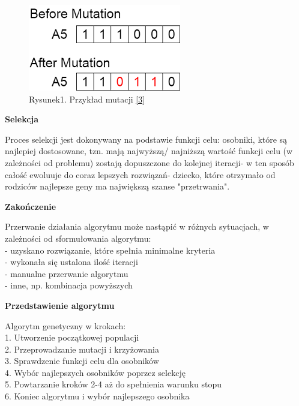 \documentclass[a4paper, twoside, 12pt, justified]{article}
\begin{document}
	\newpage

	\begin{figure}[h]
		\includegraphics[scale=1]{mutation}
		\centering
		\\
		{Rysunek1. Przykład mutacji \hyperlink{mutation}{[3]} } 
	\end{figure}
	
	\begin{center}
		\textbf{Selekcja}
	\end{center}    
	
	Proces selekcji jest dokonywany na podstawie funkcji celu: osobniki, które są najlepiej dostosowane, tzn. mają najwyższą/ najniższą wartość funkcji celu (w zależności od problemu) zostają dopuszczone do kolejnej iteracji- w ten sposób całość ewoluuje do coraz lepszych rozwiązań- dziecko, które otrzymało od rodziców najlepsze geny ma największą szanse "przetrwania".
	
	
	\begin{center}
		\textbf{Zakończenie}
	\end{center} 	

	Przerwanie działania algorytmu może nastąpić w różnych sytuacjach, w zależności od sformułowania algorytmu:\\
	- uzyskano rozwiązanie, które spełnia minimalne kryteria\\
	- wykonała się ustalona ilość iteracji\\
	- manualne przerwanie algorytmu\\
	- inne, np. kombinacja powyższych\\

 	\begin{large}
 		\begin{center}
 			\textbf{Przedstawienie algorytmu}
 		\end{center}
 	\end{large}
 
	
	Algorytm genetyczny w krokach:\\
	1. Utworzenie początkowej populacji\\
	2. Przeprowadzanie mutacji i krzyżowania\\
	3. Sprawdzenie funkcji celu dla osobników\\
	4. Wybór najlepszych osobników poprzez selekcję\\
	5. Powtarzanie kroków 2-4 aż do spełnienia warunku stopu\\
	6. Koniec algorytmu i wybór najlepszego osobnika
	
\end{document}
